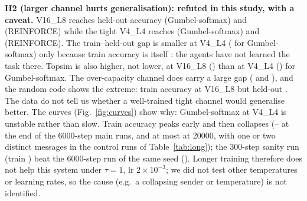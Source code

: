 \textbf{H2 (larger channel hurts generalisation): refuted in this study, with a caveat.} V16\_L8 reaches held-out accuracy  (Gumbel-softmax) and  (REINFORCE) while the tight V4\_L4 reaches  (Gumbel-softmax) and  (REINFORCE). The train--held-out gap is smaller at V4\_L4 ( for Gumbel-softmax) only because train accuracy is itself : the agents have not learned the task there. Topsim is also higher, not lower, at V16\_L8 () than at V4\_L4 () for Gumbel-softmax. The over-capacity channel does carry a large gap ( and ), and the random code shows the extreme: train accuracy  at V16\_L8 but held-out . The data do not tell us whether a well-trained tight channel would generalise better. The curves (Fig.~\ref{fig:curves}) show why: Gumbel-softmax at V4\_L4 is unstable rather than slow. Train accuracy peaks early and then collapses (-- at the end of the 6000-step main runs, and at most  at 20000, with one or two distinct messages in the control runs of Table~\ref{tab:long}); the 300-step sanity run (train ) beat the 6000-step run of the same seed (). Longer training therefore does not help this system under $\tau=1$, lr $2\times10^{-3}$; we did not test other temperatures or learning rates, so the cause (e.g.\ a collapsing sender or temperature) is not identified.

